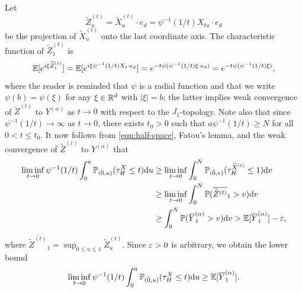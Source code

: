 \documentclass[11pt]{article}
\begin{document}
\begin{doublespace}
\[\]
Let 
\[
\widetilde{Z}_{u}^{(t)}=\widetilde{X}_{u}^{(t)}\cdot e_{d}=\psi^{-1}(1/t)X_{tu}\cdot e_{d}
\]
be the projection of $\widetilde{X}_{u}^{(t)}$ onto the last coordinate axis. The characteristic function of $\widetilde{Z}_{1}^{(t)}$ is
\[
	{\mathbb E}[e^{i\xi\widetilde{Z}_{1}^{(t)}}]={\mathbb E}[e^{i\xi \psi^{-1}(1/t)X_{t}\cdot e_{d}}]=e^{-t\psi(\psi^{-1}(1/t)\xi\cdot e_{d})}
	=e^{-t\psi(\psi^{-1}(1/t)\xi)},
\]
where the reader is reminded that $\psi$ is a radial function and that we write $\psi(b)=\psi(\xi)$ for any $\xi\in {\mathbb R}^{d}$ with $|\xi|=b$; the latter implies weak convergence of $\widetilde{Z}^{(t)}$ to $Y^{(\alpha)}$ as $t\to 0$ with respect to the $J_1$-topology. 
Note also that since $\psi^{-1}(1/t)\to \infty$ as $t\to 0$, there exists $t_{0}>0$ such that $a\psi^{-1}(1/t) \geq N$ for all $0<t\leq t_{0}$.
It now follows from \eqref{eqn:half-space}, Fatou's lemma, and the weak convergence of $\widetilde{Z}^{(t)}$ to $Y^{(\alpha)}$ that
\begin{align*}
\liminf_{t\to 0}\psi^{-1}(1/t)\int_{0}^{a}{\mathbb P}_{(\tilde{0},u)}(\tau_{H}^X\leq t)\mathrm{d} u
&\geq \liminf_{t\to 0}\int_{0}^{N}{\mathbb P}_{(\tilde{0},v)}(\tau_{H}^{\widetilde{X}^{(t)}}\leq 1)\mathrm{d} v\\
&\ge \liminf_{t\to 0}\int_{0}^{N}{\mathbb P}(\overline{\widetilde{Z}^{(t)}}_1 > v)\mathrm{d} v\\
&\ge \int_{0}^{N}{\mathbb P}(\overline{Y}_{1}^{(\alpha)}> v)\mathrm{d} v 
>{\mathbb E}[\overline{Y}_{1}^{(\alpha)}]-\varepsilon,
\end{align*}
where $\overline{\widetilde{Z}^{(t)}}_1=\sup_{0\le u\le 1}\widetilde{Z}^{(t)}_u$.
Since $\varepsilon>0$ is arbitrary, we obtain the lower bound  
\begin{align*}
\liminf_{t\to 0}\psi^{-1}(1/t)\int_{0}^{a}{\mathbb P}_{(\tilde{0},u)}(\tau_{H}^X\leq t)\mathrm{d} u\geq {\mathbb E}[\overline{Y}_{1}^{(\alpha)}].
\end{align*}




\end{doublespace}
\end{document}
